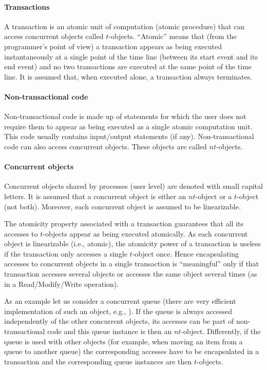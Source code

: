 \paragraph{Transactions}
A transaction is an atomic unit of computation (atomic procedure)
that can access concurrent objects called $t$-objects. 
``Atomic'' means that (from the
programmer's point of view) a transaction appears as being executed 
instantaneously at a single point of  the time line (between its start event
and its end event) and no two transactions are executed at the same point 
of the time line.  It is  assumed that, when executed alone, a transaction
always terminates.  

\paragraph{Non-transactional code}
Non-transactional code is made up of statements for which the user does not
require  them to appear  as being  executed  as  a single  atomic computation
unit. This code usually contains input/output statements (if any). 
Non-transactional code can also access concurrent objects.  
These objects are called $nt$-objects.  

\paragraph{Concurrent objects}
Concurrent objects shared by processes (user level) are denoted with
small capital letters. It is assumed that  a concurrent object is either 
an  $nt$-object  or a  $t$-object (not both). Moreover, each 
concurrent object is assumed to be linearizable. 

The atomicity property associated with a transaction guarantees 
that all its accesses to $t$-objects appear as being executed atomically. 
As each concurrent object is linearizable (i.e., atomic), 
the atomicity power of a transaction is useless if the transaction only 
accesses  a single  $t$-object once. Hence encapsulating accesses to
concurrent objects in a single transaction is ``meaningful'' only 
if that transaction   accesses several objects or accesses the same object
several times (as in a Read/Modify/Write operation).  

As an example let us consider a concurrent queue (there are very 
efficient implementation of such an object, e.g., \cite{MS96}). 
If the queue is always  accessed independently of the other concurrent 
objects,  its accesses can be part of non-transactional code and 
this queue instance is  then an $nt$-object. 
Differently,  if the queue is used with other objects
(for example, when  moving an item from a queue to another queue) the 
corresponding accesses  have to  be encapsulated in  a transaction  and the
corresponding queue instances are then  $t$-objects. 

